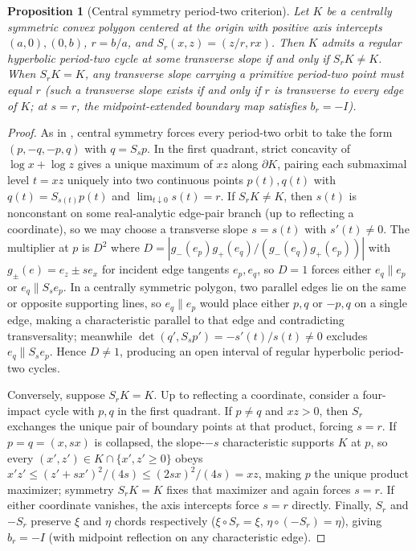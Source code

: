 \documentclass[11pt,reqno]{amsart}
\newtheorem{proposition}[theorem]{Proposition}
\theoremstyle{definition}
\theoremstyle{remark}
\begin{document}
\begin{proposition}[Central symmetry period-two criterion]\label{prop:central-p2}
Let $K$ be a centrally symmetric convex polygon centered at the origin with positive axis intercepts $(a,0), (0,b)$, $r = b/a$, and $S_r(x,z) = (z/r, rx)$. Then $K$ admits a regular hyperbolic period-two cycle at some transverse slope if and only if $S_r K \ne K$. When $S_r K = K$, any transverse slope carrying a primitive period-two point must equal $r$ (such a transverse slope exists if and only if $r$ is transverse to every edge of $K$; at $s = r$, the midpoint-extended boundary map satisfies $b_r = -I$).
\end{proposition}

\begin{proof}
As in \cite[Thm.~4.3]{Paper1}, central symmetry forces every period-two orbit to take the form $(p, -q, -p, q)$ with $q = S_s p$. In the first quadrant, strict concavity of $\log x + \log z$ gives a unique maximum of $xz$ along $\partial K$, pairing each submaximal level $t = xz$ uniquely into two continuous points $p(t), q(t)$ with $q(t) = S_{s(t)}p(t)$ and $\lim_{t\downarrow 0} s(t) = r$. If $S_r K \ne K$, then $s(t)$ is nonconstant on some real-analytic edge-pair branch (up to reflecting a coordinate), so we may choose a transverse slope $s = s(t)$ with $s'(t) \ne 0$. The multiplier at $p$ is $D^2$ where $D = |g_-(e_p)g_+(e_q)/(g_-(e_q)g_+(e_p))|$ with $g_\pm(e) = e_z \pm s e_x$ for incident edge tangents $e_p, e_q$, so $D = 1$ forces either $e_q \parallel e_p$ or $e_q \parallel S_s e_p$. In a centrally symmetric polygon, two parallel edges lie on the same or opposite supporting lines, so $e_q \parallel e_p$ would place either $p, q$ or $-p, q$ on a single edge, making a characteristic parallel to that edge and contradicting transversality; meanwhile $\det(q', S_s p') = -s'(t)/s(t) \ne 0$ excludes $e_q \parallel S_s e_p$. Hence $D \ne 1$, producing an open interval of regular hyperbolic period-two cycles.

Conversely, suppose $S_r K = K$. Up to reflecting a coordinate, consider a four-impact cycle with $p, q$ in the first quadrant. If $p \ne q$ and $xz > 0$, then $S_r$ exchanges the unique pair of boundary points at that product, forcing $s = r$. If $p = q = (x, sx)$ is collapsed, the slope-$-s$ characteristic supports $K$ at $p$, so every $(x', z') \in K \cap \{x', z' \ge 0\}$ obeys $x'z' \le (z'+sx')^2/(4s) \le (2sx)^2/(4s) = xz$, making $p$ the unique product maximizer; symmetry $S_r K = K$ fixes that maximizer and again forces $s = r$. If either coordinate vanishes, the axis intercepts force $s = r$ directly. Finally, $S_r$ and $-S_r$ preserve $\xi$ and $\eta$ chords respectively ($\xi \circ S_r = \xi$, $\eta \circ (-S_r) = \eta$), giving $b_r = -I$ (with midpoint reflection on any characteristic edge).
\end{proof}
\end{document}
